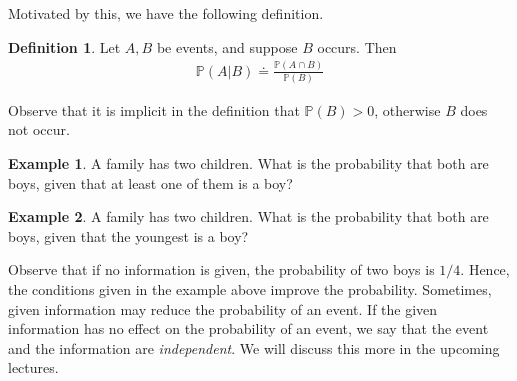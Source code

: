 \documentclass[12pt]{article}
\newcommand{\prob}{\mathbb{P}}
\theoremstyle{plain}
\theoremstyle{definition}
\newtheorem*{definition}{Definition}
\newtheorem*{example}{Example}
\theoremstyle{remark}
\numberwithin{equation}{section}  %
\begin{document}
Motivated by this, we have the following definition.
\begin{definition}
Let $A, B$ be events, and suppose $B$ occurs. Then
\begin{align*}
\prob(A | B) \doteq \frac{\prob(A \cap B)}{\prob(B)}
\end{align*}
\end{definition}
Observe that it is implicit in the definition that $\prob(B) > 0$, otherwise
$B$ does not occur.
\begin{example}
A family has two children. What is the probability that both are boys,
given that at least one of them is a boy?
\end{example}
\begin{example}
A family has two children. What is the probability that both are boys,
given that the youngest is a boy?
\end{example}
Observe that if no information is given, the probability of two boys is $1/4$.
Hence, the conditions given in the example above improve the probability.
Sometimes, given information may reduce the probability of an event.
If the given information has no effect on the probability of an event,
we say that the event and the information are \emph{independent}. We will
discuss this more in the upcoming lectures.
\end{document}
